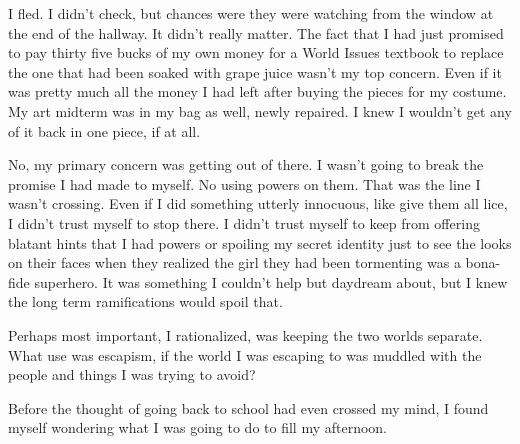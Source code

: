 I fled.  I didn't check, but chances were they were watching from the window at the end of the hallway.  It didn't really matter.  The fact that I had just promised to pay thirty five bucks of my own money for a World Issues textbook to replace the one that had been soaked with grape juice wasn't my top concern.  Even if it was pretty much all the money I had left after buying the pieces for my costume.  My art midterm was in my bag as well, newly repaired.  I knew I wouldn't get any of it back in one piece, if at all.



No, my primary concern was getting out of there.  I wasn't going to break the promise I had made to myself.  No using powers on them.  That was the line I wasn't crossing.  Even if I did something utterly innocuous, like give them all lice, I didn't trust myself to stop there.  I didn't trust myself to keep from offering blatant hints that I had powers or spoiling my secret identity just to see the looks on their faces when they realized the girl they had been tormenting was a bona-fide superhero.  It was something I couldn't help but daydream about, but I knew the long term ramifications would spoil that.



Perhaps most important, I rationalized, was keeping the two worlds separate.  What use was escapism, if the world I was escaping to was muddled with the people and things I was trying to avoid?



Before the thought of going back to school had even crossed my mind, I found myself wondering what I was going to do to fill my afternoon.





